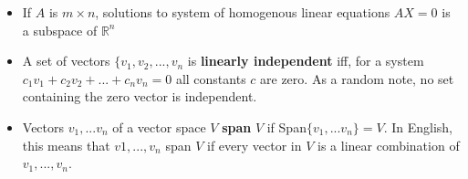 \documentclass[10pt,letterpaper]{article}
\begin{document}
\begin{itemize}
\item If $A$ is $m\times n$, solutions to system of homogenous linear equations $AX=0$ is a subspace of $\mathbb{R}^n$

\item A set of vectors $\{v_1, v_2, ..., v_n$ is \textbf{linearly independent }iff, for a system $c_1v_1+c_2v_2+...+c_nv_n=0$ all constants $c$ are zero. As a random note, no set containing the zero vector is independent. 

\item Vectors $v_1,...v_n$ of a vector space $V$ \textbf{span } $V$ if Span$\{v_1,...v_n\}=V$. In English, this means that $v1,...,v_n$ span $V$ if every vector in $V$ is a linear combination of $v_1,...,v_n$. 

\end{itemize}	
\end{document}
